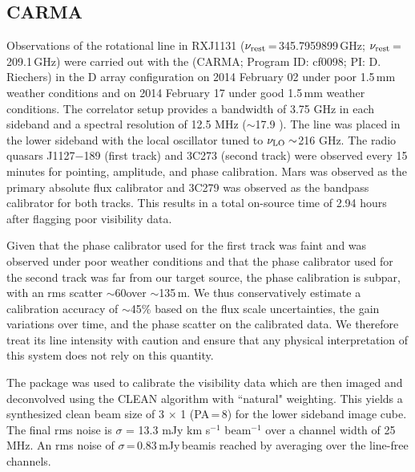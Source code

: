 \documentclass[]{emulateapj}
\begin{document}
\subsection{CARMA \cco} %
Observations of the \cco rotational line in RXJ1131
($\nu_{\rm rest}$\,=\,345.7959899\,GHz; $\nu_{\rm rest}$\,=\,209.1\,GHz)
were carried out with the \carma (CARMA;
Program ID: cf0098; PI: D. Riechers)
in the D array configuration on 2014 February 02 under poor 1.5\,mm
weather conditions and on 2014 February 17 under good 1.5\,mm
weather conditions. The correlator setup provides a bandwidth of 3.75 GHz in
each sideband and a spectral resolution of 12.5 MHz ($\sim$17.9 \kms). The
line was placed in the lower sideband with the local oscillator tuned to $\nu_{\rm LO}\sim$216 GHz. The radio quasars J1127$-$189 (first track) and 3C273
(second track) were observed
every 15 minutes for pointing, amplitude, and phase calibration. Mars was
observed as the primary absolute flux calibrator and 3C279 was observed as
the bandpass calibrator for both tracks. This results in a total on-source time of 2.94 hours after flagging poor
visibility data.

%
%
Given that the phase calibrator used for the first track was faint and was
observed under poor weather conditions and that the phase calibrator used for
the second track was far from our target source, the phase calibration is
subpar, with an rms scatter $\sim$60\degr over $\sim$135\,m.
We thus conservatively estimate
a calibration accuracy of $\sim$45\% based on the flux scale uncertainties,
the gain variations over time, and the phase scatter on the calibrated data. We
therefore treat its line intensity with caution and ensure that any physical interpretation
of this system does not rely on this quantity.

The  package was used to calibrate the visibility data which are
then imaged and deconvolved using the CLEAN algorithm with ``natural" weighting. This yields a synthesized clean
beam size of 3 $\times$ 1 (PA\,=\,8\degr) for the lower sideband
image cube. The final rms noise is $\sigma$ = 13.3 mJy km s$^{-1}$ beam$^{-1}$
over a channel width of 25\,MHz. An rms noise of
$\sigma$\,=\,0.83\,mJy\,beam\pmOne is reached by averaging over the
line-free channels.
\end{document}

